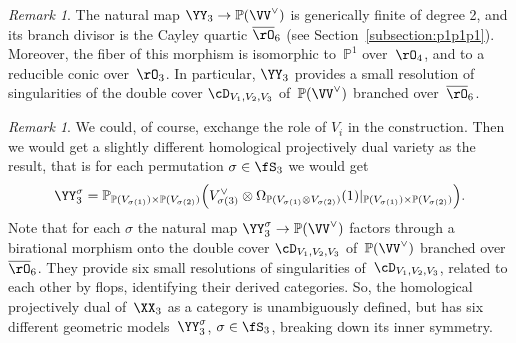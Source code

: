 \documentclass[11pt]{amsart}
\renewcommand{\P}{{\mathbb{P}}}
\theoremstyle{plain}
\theoremstyle{definition}
\theoremstyle{remark}
\newtheorem{remark}[theorem]{Remark}
\begin{document}
\begin{remark}
\label{remark:fibers-resolution-dvvv}
The natural map ${\YY_3} \to \P(\VV^\vee)$ is generically finite of degree 2, 
and its branch divisor is the Cayley quartic $\overline\rO_6$ (see Section~\ref{subsection:p1p1p1}).
Moreover, the fiber of this morphism is isomorphic to~$\P^1$ over~$\rO_4$, and to a reducible conic over~$\rO_3$.
In particular, ${\YY_3}$ provides a small resolution of singularities 
of the double cover $\cD_{V_1,V_2,V_3}$ of~$\P(\VV^\vee)$ branched over~$\overline\rO_6$.
\end{remark}

\begin{remark}
We could, of course, exchange the role of $V_i$ in the construction.
Then we would get a slightly different homological projectively dual variety as the result, 
that is for each permutation ${\sigma} \in \fS_3$ we would get
\begin{equation*}
\YY_3^{\sigma} = \P_{\P(V_{{\sigma}(1)}) \times \P(V_{{\sigma}(2)})} 
\Big(V_{{\sigma}(3)}^\vee \otimes \Omega_{\P(V_{{\sigma}(1)} \otimes V_{{\sigma}(2)})}(1)\vert_{\P(V_{{\sigma}(1)}) \times \P(V_{{\sigma}(2)})}\Big).
\end{equation*}
Note that for each ${\sigma}$ the natural map $\YY_3^{\sigma} \to \P(\VV^\vee)$ factors 
through a birational morphism onto the double cover $\cD_{V_1,V_2,V_3}$ of~$\P(\VV^\vee)$ branched over $\overline\rO_6$.
They provide six small resolutions of singularities of~$\cD_{V_1,V_2,V_3}$, 
related to each other by flops, identifying their derived categories.
So, the homological projectively dual of~$\XX_3$ as a category is unambiguously defined, 
but has six different geometric models~$\YY_3^{\sigma}$, ${\sigma} \in \fS_3$, breaking down its inner symmetry.
\end{remark}
\end{document}
